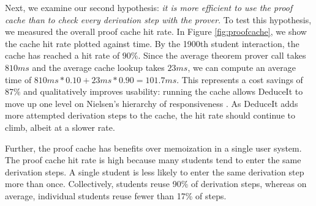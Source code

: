 \documentclass{sigchi}
\begin{document}
Next, we examine our second hypothesis: \textit{it is more efficient to use the proof cache than to check every derivation step with the prover}. To test this hypothesis, we measured the overall proof cache hit rate. In Figure \ref{fig:proofcache}, we show the cache hit rate plotted against time. By the 1900th student interaction, the cache has reached a hit rate of $90\%$. Since the average theorem prover call takes $810ms$ and the average cache lookup takes $23ms$, we can compute an average time of $810ms*0.10+23ms*0.90=101.7ms$. This represents a cost savings of 87\% and qualitatively improves usability: running the cache allows DeduceIt to move up one level on Nielsen's hierarchy of responsiveness \cite{neilsen}. As DeduceIt adds more attempted derivation steps to the cache, the hit rate should continue to climb, albeit at a slower rate.

Further, the proof cache has benefits over memoization in a single user system. The proof cache hit rate is high because many students tend to enter the same derivation steps. A single student is less likely to enter the same derivation step more than once. Collectively, students reuse 90\% of derivation steps, whereas on average, individual students reuse fewer than 17\% of steps. 


% 
\end{document}
